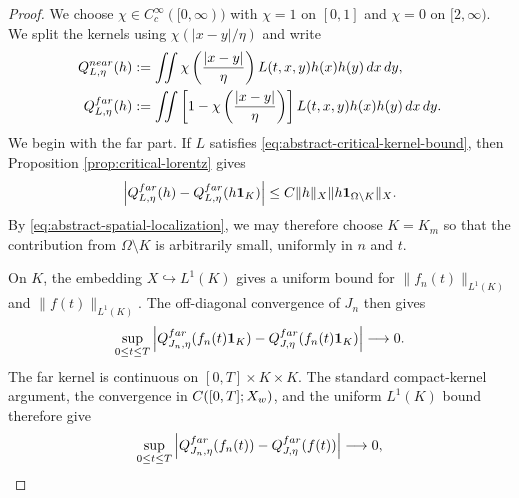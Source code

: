 \documentclass[10pt,a4paper]{amsart}
\newcommand{\Om}{\Omega}
\newcommand{\dd}{\,d}
\newcommand{\one}{\mathbf 1}
\begin{document}
\begin{proof}
We choose $\chi\in C_c^\infty([0,\infty))$ with $\chi=1$ on $[0,1]$ and
$\chi=0$ on $[2,\infty)$.  We split the kernels using
$\chi(|x-y|/\eta)$ and write
\begin{align*}
 Q_{L,\eta}^{\rm near}(h)
 &:=\iint \chi\left(\frac{|x-y|}{\eta}\right)
 L(t,x,y)h(x)h(y)\dd x\dd y,\\
 Q_{L,\eta}^{\rm far}(h)
 &:=\iint \left[1-\chi\left(\frac{|x-y|}{\eta}\right)\right]
 L(t,x,y)h(x)h(y)\dd x\dd y.
\end{align*}
We begin with the far part.  If $L$ satisfies
\eqref{eq:abstract-critical-kernel-bound}, then Proposition
\ref{prop:critical-lorentz} gives
\[
 \left|Q_{L,\eta}^{\rm far}(h)
       -Q_{L,\eta}^{\rm far}(h\one_K)\right|
 \leq C\|h\|_X\|h\one_{\Om\setminus K}\|_X.
\]
By \eqref{eq:abstract-spatial-localization}, we may therefore choose
$K=K_m$ so that the contribution from $\Om\setminus K$ is arbitrarily small,
uniformly in $n$ and $t$.

On $K$, the embedding $X\hookrightarrow L^1(K)$ gives a uniform bound for
$\|f_n(t)\|_{L^1(K)}$ and $\|f(t)\|_{L^1(K)}$.  The off-diagonal convergence
of $J_n$ then gives
\[
 \sup_{0\leq t\leq T}
 \left|Q_{J_n,\eta}^{\rm far}(f_n(t)\one_K)
       -Q_{J,\eta}^{\rm far}(f_n(t)\one_K)\right|
 \longrightarrow0.
\]
The far kernel is continuous on $[0,T]\times K\times K$.  The standard
compact-kernel argument, the convergence in $C([0,T];X_{\rm w})$, and the
uniform $L^1(K)$ bound therefore give
\begin{equation}\label{eq:far-field-convergence}
 \sup_{0\leq t\leq T}
\left|Q_{J_n,\eta}^{\rm far}(f_n(t))
       -Q_{J,\eta}^{\rm far}(f(t))\right|\longrightarrow0,
\end{equation}


\end{proof}
\end{document}
